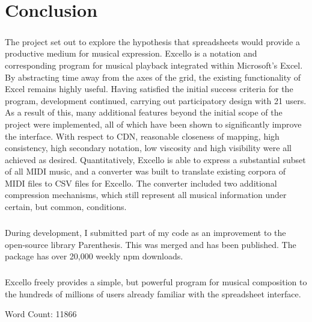 
\chapter{Conclusion}

\paragraph{} The project set out to explore the hypothesis that spreadsheets would provide a productive medium for musical expression. Excello is a notation and corresponding program for musical playback integrated within Microsoft's Excel. By abstracting time away from the axes of the grid, the existing functionality of Excel remains highly useful. Having satisfied the initial success criteria for the program, development continued, carrying out participatory design with 21 users. As a result of this, many additional features beyond the initial scope of the project were implemented, all of which have been shown to significantly improve the interface. With respect to CDN, reasonable closeness of mapping, high consistency, high secondary notation, low viscosity and high visibility were all achieved as desired. Quantitatively, Excello is able to express a substantial subset of all  MIDI music, and a converter was built to translate existing corpora of MIDI files to CSV files for Excello. The converter included two additional compression mechanisms, which still represent all musical information under certain, but common, conditions.

\paragraph{} During development, I submitted part of my code as an improvement to the open-source library Parenthesis. This was merged and has been published. The package has over 20,000 weekly npm downloads.

\paragraph{} Excello freely provides a simple, but powerful program for musical composition to the hundreds of millions of users already familiar with the spreadsheet interface. \\

\begin{flushright}
Word Count: 11866
\end{flushright}
